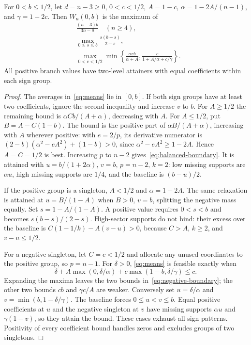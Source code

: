 \begin{lemma}\label{lem:boundary-reduction}
For $0<b\le1/2$, let $d=n-3\ge0$, $0<c<1/2$, $A=1-c$, $\alpha=1-2A/(n-1)$, and $\gamma=1-2c$. Then $W_n(0,b)$ is the maximum of
\begin{align}
&\frac{(n-3)b}{3n-8}\quad(n\ge4),\label{eq:balanced-boundary}\\
&\max_{0\le s\le b}\frac{s(b-s)}{2-s},\label{eq:positive-boundary}\\
&\max_{0<c<1/2}\min\left\{\frac{\alpha cb}{\alpha+A},
                  \frac{c}{1+A/\alpha+c/\gamma}\right\}.\label{eq:negative-boundary}
\end{align}
All positive branch values have two-level attainers with equal coefficients within each sign group.
\end{lemma}
\begin{proof}
The averages in~\eqref{eq:means} lie in $[0,b]$. If both sign groups have at least two coefficients, ignore the second inequality and increase $v$ to $b$. For $A\ge1/2$ the remaining bound is $\alpha Cb/(A+\alpha)$, decreasing with $A$. For $A\le1/2$, put $B=A-C(1-b)$. The bound is the positive part of $\alpha B/(A+\alpha)$, increasing with $A$ wherever positive: with $e=2/p$, its derivative numerator is $(2-b)(\alpha^2-eA^2)+(1-b)>0$, since $\alpha^2-eA^2\ge1-2A$. Hence $A=C=1/2$ is best. Increasing $p$ to $n-2$ gives~\eqref{eq:balanced-boundary}. It is attained with $u=b/(1+2\alpha)$, $v=b$, $p=n-2$, $k=2$: low missing supports are $\alpha u$, high missing supports are $1/4$, and the baseline is $(b-u)/2$.

If the positive group is a singleton, $A<1/2$ and $\alpha=1-2A$. The same relaxation is attained at $u=B/(1-A)$ when $B>0$, $v=b$, splitting the negative mass equally. Set $s=1-A/(1-A)$. A positive value requires $0<s<b$ and becomes $s(b-s)/(2-s)$. High-sector supports do not bind: their excess over the baseline is $C(1-1/k)-A(v-u)>0$, because $C>A$, $k\ge2$, and $v-u\le1/2$.

For a negative singleton, let $C=c<1/2$ and allocate any unused coordinates to the positive group, so $p=n-1$. For $\delta>0$, \eqref{eq:means} is feasible exactly when
\[
\delta+A\max(0,\delta/\alpha)+c\max(1-b,\delta/\gamma)\le c.
\]
Expanding the maxima leaves the two bounds in~\eqref{eq:negative-boundary}; the other two bounds $cb$ and $\gamma c/A$ are weaker. Conversely set $u=\delta/\alpha$ and $v=\min(b,1-\delta/\gamma)$. The baseline forces $0\le u<v\le b$. Equal positive coefficients at $u$ and the negative singleton at $v$ have missing supports $\alpha u$ and $\gamma(1-v)$, so they attain the bound. These cases exhaust all sign patterns. Positivity of every coefficient bound handles zeros and excludes groups of two singletons.
\end{proof}
